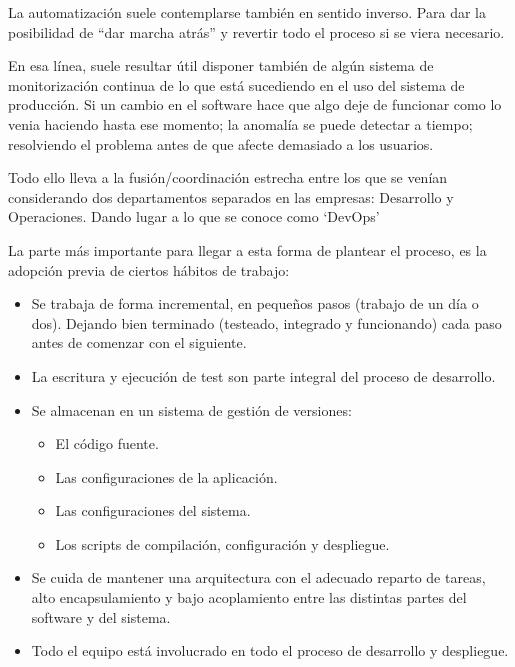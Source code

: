 \documentclass[spanish,12pt,a4paper,final,oneside]{book}
\begin{document}
La automatización suele contemplarse también en sentido inverso. Para dar la posibilidad de ``dar marcha atrás'' y revertir todo el proceso si se viera necesario.

En esa línea, suele resultar útil disponer también de algún sistema de monitorización continua de lo que está sucediendo en el uso del sistema de producción. Si un cambio en el software hace que algo deje de funcionar como lo venia haciendo hasta ese momento; la anomalía se puede detectar a tiempo; resolviendo el problema antes de que afecte demasiado a los usuarios.

Todo ello lleva a la fusión/coordinación estrecha entre los que se venían considerando dos departamentos separados en las empresas: Desarrollo y Operaciones. Dando lugar a lo que se conoce como `DevOps'

\vspace{0.5cm}

La parte más importante para llegar a esta forma de plantear el proceso, es la adopción previa de ciertos hábitos de trabajo:

\begin{itemize}

\item Se trabaja de forma incremental, en pequeños pasos (trabajo de un día o dos). Dejando bien terminado (testeado, integrado y funcionando) cada paso antes de comenzar con el siguiente.

\item La escritura y ejecución de test son parte integral del proceso de desarrollo.

\item Se almacenan en un sistema de gestión de versiones:
\begin{itemize}
\item El código fuente.
\item Las configuraciones de la aplicación.
\item Las configuraciones del sistema.
\item Los scripts de compilación, configuración y despliegue.
\end{itemize}

\item Se cuida de mantener una arquitectura con el adecuado reparto de tareas, alto encapsulamiento y bajo acoplamiento entre las distintas partes del software y del sistema.
 
\item Todo el equipo está involucrado en todo el proceso de desarrollo y despliegue.

\end{itemize}
\end{document}
